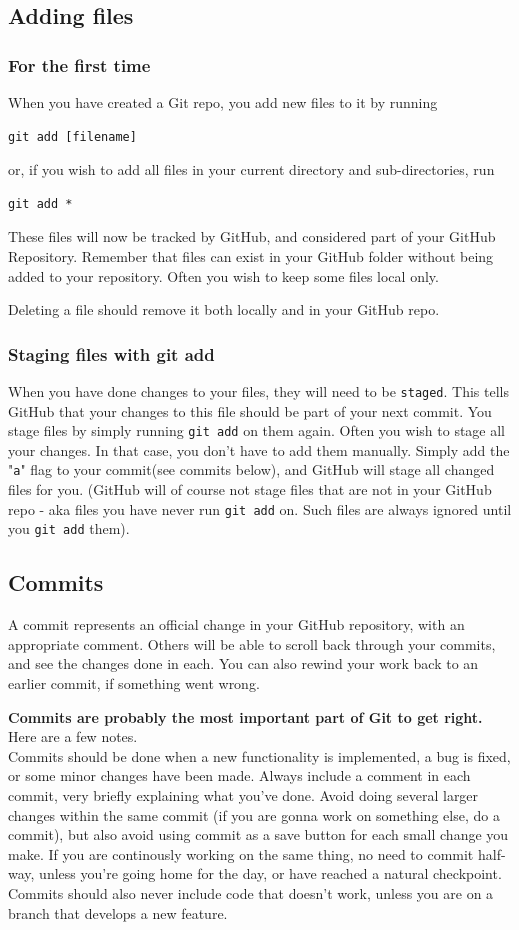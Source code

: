 \documentclass[12p,a4paper]{article}
\begin{document}
\subsection{Adding files}
\subsubsection{For the first time}
When you have created a Git repo, you add new files to it by running
\begin{verbatim}
git add [filename]
\end{verbatim}
or, if you wish to add all files in your current directory and sub-directories, run
\begin{verbatim}
git add *
\end{verbatim}
These files will now be tracked by GitHub, and considered part of your GitHub Repository. Remember that files can exist in your GitHub folder without being added to your repository. Often you wish to keep some files local only.

Deleting a file should remove it both locally and in your GitHub repo.

\subsubsection{Staging files with git add}
When you have done changes to your files, they will need to be \texttt{staged}. This tells GitHub that your changes to this file should be part of your next commit. You stage files by simply running \texttt{git add} on them again. Often you wish to stage all your changes. In that case, you don't have to add them manually. Simply add the "\texttt{a}" flag to your commit(see commits below), and GitHub will stage all changed files for you. (GitHub will of course not stage files that are not in your GitHub repo - aka files you have never run \texttt{git add} on. Such files are always ignored until you \texttt{git add} them).


\subsection{Commits}
A commit represents an official change in your GitHub repository, with an appropriate comment. Others will be able to scroll back through your commits, and see the changes done in each. You can also rewind your work back to an earlier commit, if something went wrong.

\textbf{Commits are probably the most important part of Git to get right.} Here are a few notes.\\
Commits should be done when a new functionality is implemented, a bug is fixed, or some minor changes have been made. Always include a comment in each commit, very briefly explaining what you've done. Avoid doing several larger changes within the same commit (if you are gonna work on something else, do a commit), but also avoid using commit as a save button for each small change you make. If you are continously working on the same thing, no need to commit half-way, unless you're going home for the day, or have reached a natural checkpoint. Commits should also never include code that doesn't work, unless you are on a branch that develops a new feature.
\end{document}
